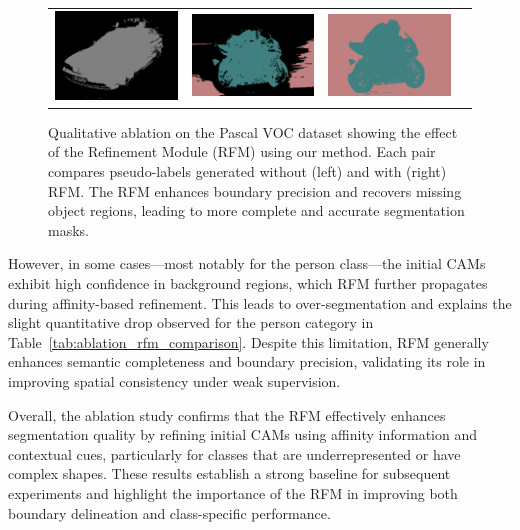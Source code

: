 \begin{figure}[H]
\begin{tabular}{c c c c}
    \includegraphics[width=0.18\linewidth, height=0.18\linewidth]{figures/ablation/withrfm/2010_003276_[6]} & \hspace{2pt}
    \includegraphics[width=0.18\linewidth, height=0.18\linewidth]{figures/ablation/withoutrfm/2009_000074_[13, 14]} &
    \includegraphics[width=0.18\linewidth, height=0.18\linewidth]{figures/ablation/withrfm/2009_000074_[13, 14]} \\
  \end{tabular}

  \caption{Qualitative ablation on the Pascal VOC dataset showing the effect of the Refinement Module (RFM) \cite{wsss_frozen_clip} using our method. Each pair compares pseudo-labels generated without (left) and with (right) RFM. The RFM enhances boundary precision and recovers missing object regions, leading to more complete and accurate segmentation masks.}
  \label{fig:qualitative_ablation}
\end{figure}

However, in some cases—most notably for the person class—the initial CAMs exhibit high confidence in background regions, which RFM further propagates during affinity-based refinement. This leads to over-segmentation and explains the slight quantitative drop observed for the person category in Table~\ref{tab:ablation_rfm_comparison}. Despite this limitation, RFM generally enhances semantic completeness and boundary precision, validating its role in improving spatial consistency under weak supervision.

Overall, the ablation study confirms that the RFM effectively enhances segmentation quality by refining initial CAMs using affinity information and contextual cues, particularly for classes that are underrepresented or have complex shapes. These results establish a strong baseline for subsequent experiments and highlight the importance of the RFM in improving both boundary delineation and class-specific performance.
